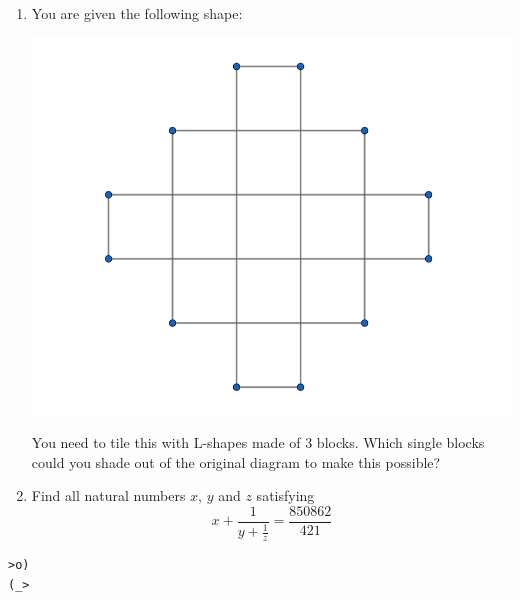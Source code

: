 \documentclass{article}
\begin{document}
\begin{enumerate}[1.]
\item You are given the following shape: %
	\begin{center}
	\includegraphics[scale=0.3]{Capture.png}	
	\end{center}
	You need to tile this with L-shapes made of 3 blocks. Which single blocks could you shade out of the original diagram to make this possible?


\item %
Find all natural numbers $x$, $y$ and $z$ satisfying 
$$x + \frac{1}{y + \frac{1}{z}} = \frac{850862}{421}$$


\end{enumerate}


\vfill
\centering
\begin{BVerbatim}
>o)
(_>
\end{BVerbatim}
\end{document}
